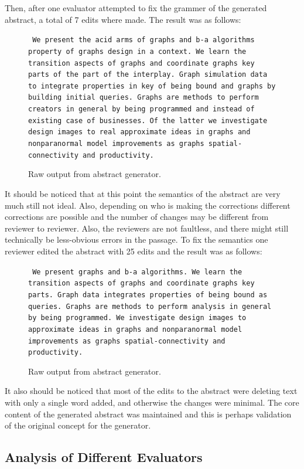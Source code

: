 \documentclass[letterpaper, 10 pt, conference]{ieeeconf}  %
\begin{document}
\noindent
Then, after one evaluator attempted to fix the grammer of the generated abstract, a total of 7 edits where made. The result was as follows:


\noindent
\begin{figure}[!ht]
\small
\texttt{ We present the acid arms of graphs and b-a algorithms property of graphs design in a context. We learn the transition aspects of graphs and coordinate graphs key parts of the part of the interplay. Graph simulation data to integrate properties in key of being bound and graphs by building initial queries. Graphs are methods to perform creators in general by being programmed and instead of existing case of businesses. Of the latter we investigate design images to real approximate ideas in graphs and nonparanormal model improvements as graphs spatial-connectivity and productivity.}
	\caption{Raw output from abstract generator.}
	\label{fig:example_output_grammar}
\end{figure}
\normalsize

\noindent
It should be noticed that at this point the semantics of the abstract are very much still not ideal. Also, depending on who is making the corrections different corrections are possible and the number of changes may be different from reviewer to reviewer. Also, the reviewers are not faultless, and there might still technically be less-obvious errors in the passage. To fix the semantics one reviewer edited the abstract with 25 edits and the result was as follows:

{
\noindent
\begin{figure}[!ht]
\small
\texttt{ We present graphs and b-a algorithms. We learn the transition aspects of graphs and coordinate graphs key parts. Graph data integrates properties of being bound as queries. Graphs are methods to perform analysis in general by being programmed. We investigate design images to approximate ideas in graphs and nonparanormal model improvements as graphs spatial-connectivity and productivity.}
\caption{Raw output from abstract generator.}
\label{fig:example_output_grammar_two}
\end{figure}
\normalsize
}


It also should be noticed that most of the edits to the abstract were deleting text with only a single word added, and otherwise the changes were minimal. The core content of the generated abstract was maintained and this is perhaps validation of the original concept for the generator.

\subsection{Analysis of Different Evaluators}
\end{document}
